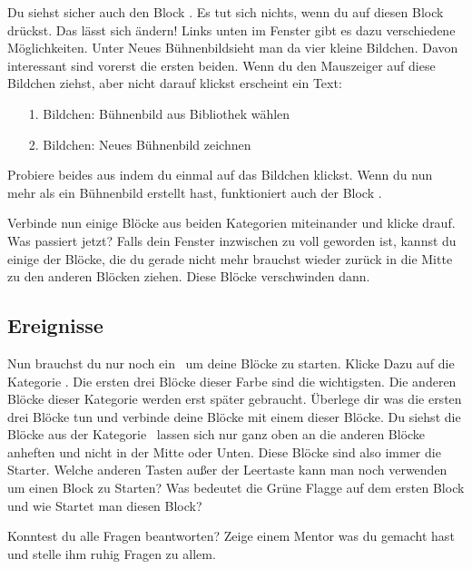 \documentclass{\VorlagenPfad/coderdojokatext}
\begin{document}
Du siehst sicher auch den Block . Es tut sich nichts, wenn du auf diesen Block drückst. Das lässt sich ändern! Links unten im Fenster gibt es dazu verschiedene Möglichkeiten. Unter \glqq Neues Bühnenbild\grqq sieht man da vier kleine Bildchen. Davon interessant sind vorerst die ersten beiden. Wenn du den Mauszeiger auf diese Bildchen ziehst, aber nicht darauf klickst erscheint ein Text:

\begin{enumerate}
\item[1. Bildchen:] Bühnenbild aus Bibliothek wählen
\item[2. Bildchen:] Neues Bühnenbild zeichnen
\end{enumerate}

Probiere beides aus indem du einmal auf das Bildchen klickst. 
Wenn du nun mehr als ein Bühnenbild erstellt hast, funktioniert auch der Block .

Verbinde nun einige Blöcke aus beiden Kategorien miteinander und klicke drauf. Was passiert jetzt?
Falls dein Fenster inzwischen zu voll geworden ist, kannst du einige der Blöcke, die du gerade nicht mehr brauchst wieder zurück in die Mitte zu den anderen Blöcken ziehen. Diese Blöcke verschwinden dann.

\subsection{Ereignisse}
Nun brauchst du nur noch ein \KEre $\,$ um deine Blöcke zu starten. Klicke Dazu auf die Kategorie \KEre. Die ersten drei Blöcke dieser Farbe sind die wichtigsten. Die anderen Blöcke dieser Kategorie werden erst später gebraucht. Überlege dir was die ersten drei Blöcke tun und verbinde deine Blöcke mit einem dieser Blöcke. Du siehst die Blöcke aus der Kategorie \KEre $\,$ lassen sich nur ganz oben an die anderen Blöcke anheften und nicht in der Mitte oder Unten. Diese Blöcke sind also immer die Starter. Welche anderen Tasten außer der Leertaste kann man noch verwenden um einen Block zu Starten? Was bedeutet die Grüne Flagge auf dem ersten Block und wie Startet man diesen Block?

Konntest du alle Fragen beantworten? Zeige einem Mentor was du gemacht hast und stelle ihm ruhig Fragen zu allem.
\end{document}
